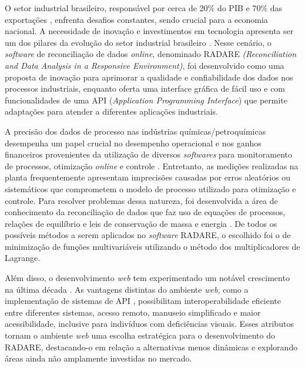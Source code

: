 \label{Cap:Introducao}

O setor industrial brasileiro, responsável por cerca de 20\% do PIB e 70\% das exportações \cite{cni2024}, enfrenta desafios constantes, sendo crucial para a economia nacional. A necessidade de inovação e investimentos em tecnologia apresenta ser um dos pilares da evolução do setor industrial brasileiro \cite{produtividadeindustria}. Nesse cenário, o \textit{software} de reconciliação de dados \textit{online}, denominado RADARE \textit{(Reconciliation and Data Analysis in a Responsive Environment)}, foi desenvolvido como uma proposta de inovação para aprimorar a qualidade e confiabilidade dos dados nos processos industriais, enquanto oferta uma interface gráfica de fácil uso e com funcionalidades de uma API (\textit{Application Programming Interface}) que permite adaptações para atender a diferentes aplicações industriais.

A precisão dos dados de processo nas indústrias químicas/petroquímicas desempenha um papel crucial no desempenho operacional e nos ganhos financeiros provenientes da utilização de diversos \textit{softwares} para monitoramento de processos, otimização \textit{online} e controle \cite{datarecshakar}. Entretanto, as medições realizadas na planta frequentemente apresentam imprecisões causadas por erros aleatórios ou sistemáticos que comprometem o modelo de processo utilizado para otimização e controle. Para resolver problemas dessa natureza, foi desenvolvida a área de conhecimento da reconciliação de dados que faz uso de equações de processos, relações de equilíbrio e leis de conservação de massa e energia \cite{reformulationdatarecon}. De todos os possíveis métodos a serem aplicados no \textit{software} RADARE, o escolhido foi o de minimização de funções multivariáveis utilizando o método dos multiplicadores de Lagrange.

Além disso, o desenvolvimento \textit{web} tem experimentado um notável crescimento na última década \cite{webusage}. As vantagens distintas do ambiente \textit{web}, como a implementação de sistemas de API \cite{apirest}, possibilitam interoperabilidade eficiente entre diferentes sistemas, acesso remoto, manuseio simplificado \cite{apiimportance} e maior acessibilidade, inclusive para indivíduos com deficiências visuais. Esses atributos tornam o ambiente \textit{web} uma escolha estratégica para o desenvolvimento do RADARE, destacando-o em relação a alternativas menos dinâmicas e explorando áreas ainda não amplamente investidas no mercado.

